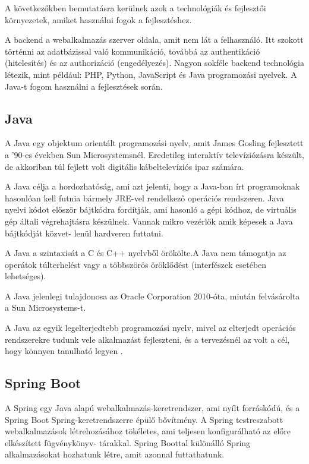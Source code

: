 
A következőkben bemutatásra kerülnek azok a technológiák és fejlesztői környezetek, amiket használni fogok a fejlesztéshez.


A backend a webalkalmazás szerver oldala, amit nem lát a felhasználó. Itt szokott történni az adatbázissal való kommunikáció, továbbá az authentikáció (hitelesítés) és az authorizáció (engedélyezés). Nagyon sokféle backend technológia létezik, mint például: PHP, Python, JavaScript és Java programozási nyelvek. A Java-t fogom használni a fejlesztések során.

\subsection{Java}

A Java \cite{Java} egy objektum orientált programozási nyelv, amit James Gosling fejlesztett a ’90-es években Sun Microsystemsnél. Eredetileg interaktív televíziózásra készült, de akkoriban túl fejlett volt digitális kábeltelevíziós ipar számára.

A Java célja a hordozhatóság, ami azt jelenti, hogy a Java-ban írt programoknak hasonlóan kell futnia bármely JRE-vel rendelkező operációs rendszeren. Java nyelvi kódot először bájtkódra fordítják, ami hasonló a gépi kódhoz, de virtuális gép általi végrehajtásra készülnek. Vannak mikro vezérlők amik képesek a Java bájtkódját közvet-
lenül hardveren futtatni.

A Java a szintaxisát a C és C++ nyelvből örökölte.A Java nem támogatja az operátok túlterhelést vagy a többszörös öröklődést (interfészek esetében lehetséges).

A Java jelenlegi tulajdonosa az Oracle Corporation 2010-óta, miután felvásárolta a Sun Microsystems-t.

A Java az egyik legelterjedtebb programozási nyelv, mivel az elterjedt operációs rendszerekre tudunk vele alkalmazást fejleszteni, és a tervezésnél az volt a cél, hogy könnyen tanulható legyen .

\subsection{Spring Boot}

A Spring egy Java alapú webalkalmazás-keretrendszer, ami nyílt forráskódú, és a Spring Boot Spring-keretrendszerre épülő bővítmény. A Spring testreszabott webalkalmazások létrehozásához tökéletes, ami teljesen konfigurálható az előre elkészített fügvénykönyv-
tárakkal. Spring Boottal különálló Spring alkalmazásokat hozhatunk létre, amit azonnal futtathatunk.

